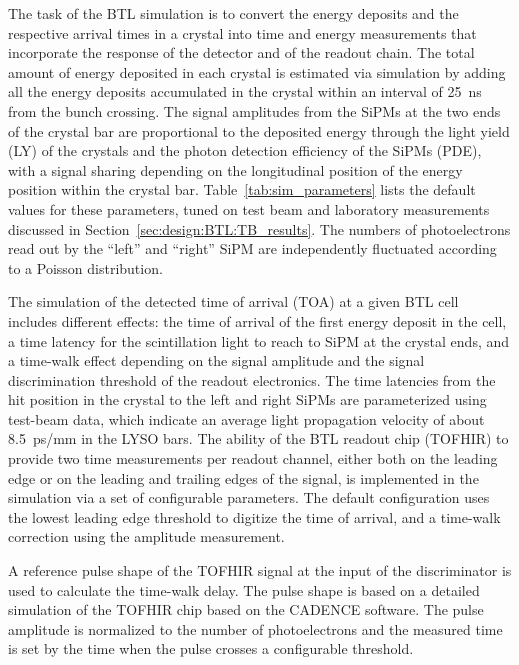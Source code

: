 The task of the BTL simulation is to convert the energy deposits and
the respective arrival times in a crystal into time and energy
measurements that incorporate the response of the detector
and of the readout chain. 
The total amount of energy deposited in each crystal is estimated via
\GEANT simulation by adding all the energy deposits accumulated in the
crystal within an interval of 25~ns from the bunch crossing. 
The signal amplitudes from the SiPMs at the two ends of the crystal
bar are proportional to the deposited energy through the light yield
(LY) of the crystals and the photon detection efficiency of the SiPMs
(PDE), with a signal sharing depending on the longitudinal position of
the energy position within the crystal bar. 
Table~\ref{tab:sim_parameters} lists the default values for these
parameters, tuned on test beam and laboratory measurements discussed
in Section~\ref{sec:design:BTL:TB_results}.   
The numbers of photoelectrons read out by the ``left'' and ``right'' SiPM are
independently fluctuated according to a Poisson distribution. 

The simulation of the detected time of arrival (TOA) at a given BTL
cell includes different effects: the time of arrival of the first
energy deposit in the cell, a time latency for the scintillation light
to reach to SiPM at the crystal ends, and a time-walk effect depending
on the signal amplitude and the signal discrimination threshold of the
readout electronics. The time latencies from the hit position in the
crystal to the left and right SiPMs are parameterized using
test-beam data, which indicate an average light propagation velocity
of about 8.5~ps/mm in the LYSO bars.  
%
The ability of the BTL readout chip (TOFHIR) to provide two time
measurements per readout channel, either both on the leading edge or
on the leading and trailing edges of the signal, is implemented in the
simulation via a set of configurable parameters. The default
configuration uses the lowest leading edge threshold to digitize the
time of arrival, and a time-walk correction using the amplitude
measurement. 
% 

A reference pulse shape of the TOFHIR signal at the input of the
discriminator is used to
calculate the time-walk delay. The pulse shape is based on a detailed
simulation of the TOFHIR chip based on the CADENCE software.  The pulse
amplitude is normalized to the number of photoelectrons 
and the measured time is set by the time when the pulse crosses a
configurable threshold. 

